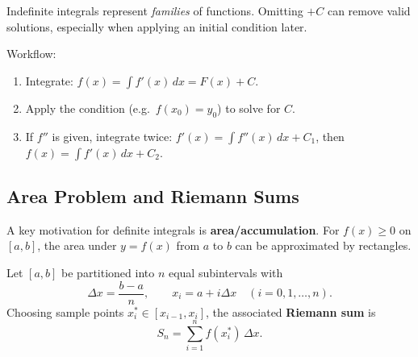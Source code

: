 \begin{commonmistake}[title={Common Mistake: Dropping $+C$ (and losing solutions)}]
Indefinite integrals represent \emph{families} of functions. Omitting $+C$ can remove valid solutions, especially when applying an initial condition later.
\end{commonmistake}

\begin{examtip}[title={Exam Focus: Solving for $f$ given $f'$ (and initial data)}]
Workflow:
\begin{enumerate}[label=(\arabic*)]
\item Integrate: $f(x)=\int f'(x)\,dx = F(x)+C$.
\item Apply the condition (e.g.\ $f(x_0)=y_0$) to solve for $C$.
\item If $f''$ is given, integrate twice: $f'(x)=\int f''(x)\,dx + C_1$, then $f(x)=\int f'(x)\,dx + C_2$.
\end{enumerate}
\end{examtip}

\subsection{Area Problem and Riemann Sums}

A key motivation for definite integrals is \textbf{area/accumulation}. For $f(x)\ge 0$ on $[a,b]$, the area under $y=f(x)$ from $a$ to $b$ can be approximated by rectangles.

Let $[a,b]$ be partitioned into $n$ equal subintervals with
\[
\Delta x = \frac{b-a}{n},\qquad x_i=a+i\Delta x\quad (i=0,1,\dots,n).
\]
Choosing sample points $x_i^\ast\in[x_{i-1},x_i]$, the associated \textbf{Riemann sum} is
\[
S_n=\sum_{i=1}^n f(x_i^\ast)\,\Delta x.
\]


\begin{center}
\end{center}

